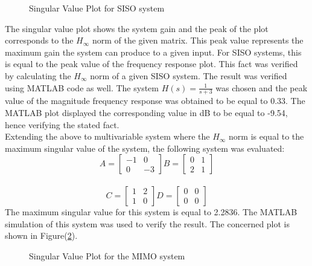 \documentclass[a4paper,12pt]{article}
\begin{document}
				\begin{figure}[H]
 
			  \centering
			  
			  
			  \caption{Singular Value Plot for SISO system}
			 \label{singular1}
		\end{figure}	
		The singular value plot shows the system gain and the peak of the plot corresponds to the $H_{\infty}$ norm of the given matrix. This peak value represents the maximum gain the system can produce to a given input. For SISO systems, this is equal to the peak value of the frequency response plot. This fact was verified by calculating the $H_{\infty}$ norm of a given SISO system. The result was verified using MATLAB code as well. The system $H(s)=\frac{1}{s+3}$ was chosen and the peak value of the magnitude frequency response was obtained to be equal to 0.33. The MATLAB plot displayed the corresponding value in dB to be equal to -9.54, hence verifying the stated fact. \\
		Extending the above to multivariable system where the $H_{\infty}$ norm is equal to the maximum singular value of the system, the following system was evaluated:
		\[A=
		\begin{bmatrix}
		-1 & 0 \\ 0 & -3
		\end{bmatrix}
		B=
		\begin{bmatrix}
		0 & 1 \\ 2 & 1
		\end{bmatrix}
		\]
		\\
		\[C=
		\begin{bmatrix}
		1 & 2 \\ 1 & 0
		\end{bmatrix}
		D=\begin{bmatrix}
		0 & 0\\ 0 & 0		\end{bmatrix}
		\]
		The maximum singular value for this system is equal to 2.2836. The MATLAB simulation of this system was used to verify the result. The concerned plot is shown in Figure(\ref{singular2}).
		
				\begin{figure}[H]
 
			  \centering
			  
			  
			  \caption{Singular Value Plot for the MIMO system}
			 \label{singular2}
		\end{figure}			
\end{document}
